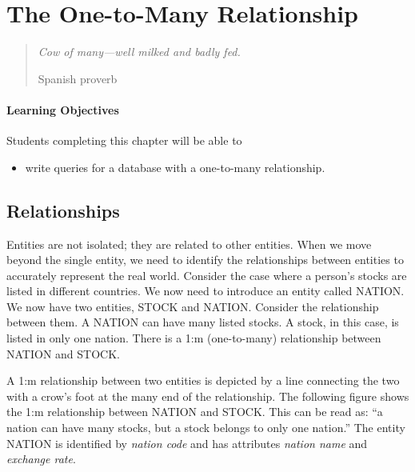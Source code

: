 \documentclass[
]{article}
\providecommand{\tightlist}{%
  \setlength{\itemsep}{0pt}\setlength{\parskip}{0pt}}
\begin{document}
\hypertarget{the-one-to-many-relationship}{%
\section{The One-to-Many
Relationship}\label{the-one-to-many-relationship}}

\begin{quote}
\emph{Cow of many---well milked and badly fed.}

Spanish proverb
\end{quote}

\hypertarget{learning-objectives-1}{%
\paragraph*{Learning Objectives}\label{learning-objectives-1}}

Students completing this chapter will be able to

\begin{itemize}
\tightlist
\item
  write queries for a database with a one-to-many relationship.
\end{itemize}

\hypertarget{relationships}{%
\subsection{Relationships}\label{relationships}}

Entities are not isolated; they are related to other entities. When we
move beyond the single entity, we need to identify the relationships
between entities to accurately represent the real world. Consider the
case where a person's stocks are listed in different countries. We now
need to introduce an entity called NATION. We now have two entities,
STOCK and NATION. Consider the relationship between them. A NATION can
have many listed stocks. A stock, in this case, is listed in only one
nation. There is a 1:m (one-to-many) relationship between NATION and
STOCK.

A 1:m relationship between two entities is depicted by a line connecting
the two with a crow's foot at the many end of the relationship. The
following figure shows the 1:m relationship between NATION and STOCK.
This can be read as: ``a nation can have many stocks, but a stock
belongs to only one nation.'' The entity NATION is identified by
\emph{nation code} and has attributes \emph{nation name} and
\emph{exchange rate}.
\end{document}
